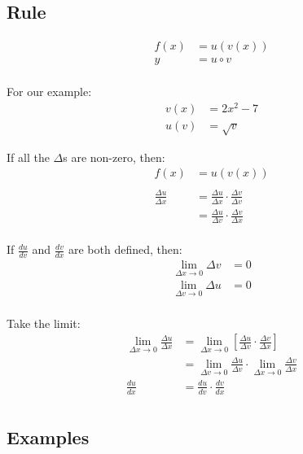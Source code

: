 \documentclass[letterpaper, landscape]{exam}
\begin{document}
  \subsection{Rule} %
  
  \begin{align*}
    f(x) & = u(v(x)) \\
    y    & = u \circ v \\
  \end{align*}

  For our example:
  \begin{align*}
    v(x) & = 2x^2 - 7 \\
    u(v) & = \sqrt{v}
  \end{align*}

  If all the $\Delta$s are non-zero, then:
  \begin{align*}
    f(x) &= u(v(x)) \\
    \\
    \frac{\Delta u}{\Delta x} & = \frac{\Delta u}{\Delta x} \cdot \frac{\Delta v}{\Delta v} \\
                              & = \frac{\Delta u}{\Delta v} \cdot \frac{\Delta v}{\Delta x} \\
  \end{align*}

  If $\frac{du}{dv}$ and $\frac{dv}{dx}$ are both defined, then:
  \begin{align*}
    \lim_{\Delta x \to 0} \Delta v &= 0 \\
    \lim_{\Delta v \to 0} \Delta u &= 0 \\
  \end{align*}

  Take the limit:
  \begin{align*}
    \lim_{\Delta x \to 0} \frac{\Delta u}{\Delta x} 
                  & = \lim_{\Delta x \to 0} \left[ \frac{\Delta u}{\Delta v} \cdot \frac{\Delta v}{\Delta x} \right] \\
                  & = \lim_{\Delta v \to 0} \frac{\Delta u}{\Delta v} \cdot \lim_{\Delta x \to 0} \frac{\Delta v}{\Delta x} \\
    \frac{du}{dx} & = \frac{du}{dv} \cdot \frac{dv}{dx} \\
  \end{align*}

  \subsection{Examples}
\end{document}

